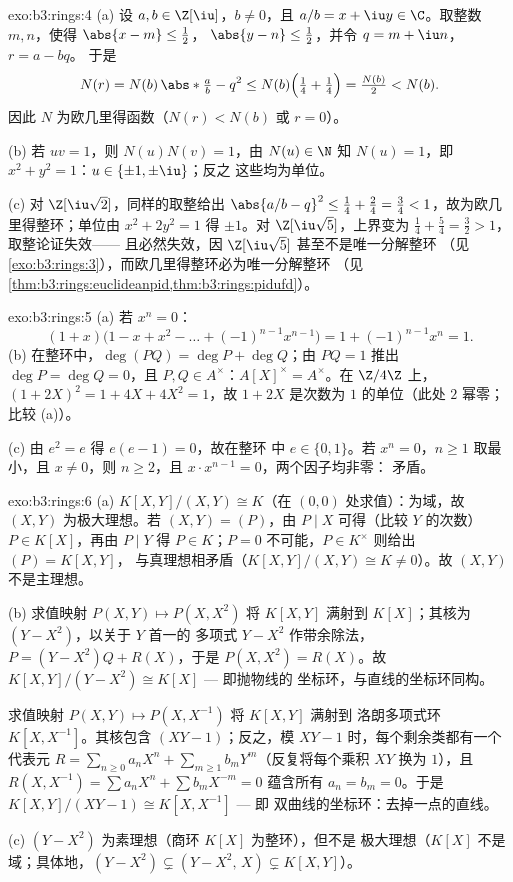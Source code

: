 \begin{solution}{exo:b3:rings:4}
(a) 设 $a, b \in \Z[\iu]$，$b \neq 0$，且 $a/b = x + \iu y \in
\C$。取整数 $m, n$，使得 $\abs{x - m} \leq \frac12$，
$\abs{y - n} \leq \frac12$，并令 $q = m + \iu n$，$r = a - bq$。
于是
\[
N(r) = N(b)\,\abs*{\tfrac ab - q}^2
\leq N(b)\Bigl(\tfrac14 + \tfrac14\Bigr) = \tfrac{N(b)}2 < N(b).
\]
因此 $N$ 为欧几里得函数（$N(r) < N(b)$ 或 $r = 0$）。

(b) 若 $uv = 1$，则 $N(u)N(v) = 1$，由 $N(u) \in \N$ 知 $N(u) =
1$，即 $x^2 + y^2 = 1$：$u \in \{\pm 1, \pm\iu\}$；反之
这些均为单位。

(c) 对 $\Z[\iu\sqrt2]$，同样的取整给出 $\abs{a/b - q}^2
\leq \frac14 + \frac{2}4 = \frac34 < 1$，故为欧几里得整环；单位由 $x^2 +
2y^2 = 1$ 得 $\pm 1$。对 $\Z[\iu\sqrt5]$，上界变为
$\frac14 + \frac54 = \frac32 > 1$，取整论证失效——
且必然失效，因 $\Z[\iu\sqrt5]$ 甚至不是唯一分解整环
（见\cref{exo:b3:rings:3}），而欧几里得整环必为唯一分解整环
（见\cref{thm:b3:rings:euclideanpid,thm:b3:rings:pidufd}）。
\end{solution}

\begin{solution}{exo:b3:rings:5}
(a) 若 $x^n = 0$：
\[
(1 + x)\bigl(1 - x + x^2 - \dots + (-1)^{n-1}x^{n-1}\bigr)
= 1 + (-1)^{n-1}x^n = 1 .
\]
(b) 在整环中，$\deg(PQ) = \deg P + \deg Q$；由 $PQ = 1$ 推出
$\deg P = \deg Q = 0$，且 $P, Q \in A^\times$：$A[X]^\times =
A^\times$。在 $\Z/4\Z$ 上，$(1 + 2X)^2 = 1 + 4X + 4X^2 = 1$，故 $1
+ 2X$ 是次数为 $1$ 的单位（此处 $2$ 幂零；比较
(a)）。

(c) 由 $e^2 = e$ 得 $e(e - 1) = 0$，故在整环
中 $e \in \{0, 1\}$。若 $x^n = 0$，$n \geq 1$ 取最小，且 $x \ne 0$，则
$n \geq 2$，且 $x \cdot x^{n-1} = 0$，两个因子均非零：
矛盾。
\end{solution}

\begin{solution}{exo:b3:rings:6}
(a) $K[X,Y]/(X,Y) \cong K$（在 $(0,0)$ 处求值）：为域，故
$(X,Y)$ 为极大理想。若 $(X, Y) = (P)$，由 $P \mid X$ 可得（比较
$Y$ 的次数）$P \in K[X]$，再由 $P \mid Y$ 得 $P \in K$；$P =
0$ 不可能，$P \in K^\times$ 则给出 $(P) = K[X,Y]$，
与真理想相矛盾（$K[X,Y]/(X,Y) \cong K \neq 0$）。故
$(X,Y)$ 不是主理想。

(b) 求值映射 $P(X, Y) \mapsto P(X, X^2)$ 将 $K[X,Y]$ 满射到
$K[X]$；其核为 $(Y - X^2)$，以关于 $Y$ 首一的
多项式 $Y - X^2$ 作带余除法，$P = (Y - X^2)Q + R(X)$，于是 $P(X, X^2) =
R(X)$。故 $K[X,Y]/(Y - X^2) \cong K[X]$ --- 即抛物线的
坐标环，与直线的坐标环同构。

求值映射 $P(X, Y) \mapsto P(X, X^{-1})$ 将 $K[X, Y]$ 满射到
洛朗多项式环 $K[X, X^{-1}]$。其核包含
$(XY - 1)$；反之，模 $XY - 1$ 时，每个剩余类都有一个
代表元 $R = \sum_{n \geq 0} a_nX^n + \sum_{m \geq 1} b_m
Y^m$（反复将每个乘积 $XY$ 换为 $1$），且 $R(X,
X^{-1}) = \sum a_n X^n + \sum b_m X^{-m} = 0$ 蕴含所有 $a_n =
b_m = 0$。于是 $K[X, Y]/(XY - 1) \cong K[X, X^{-1}]$ --- 即
双曲线的坐标环：去掉一点的直线。

(c) $(Y - X^2)$ 为素理想（商环 $K[X]$ 为整环），但不是
极大理想（$K[X]$ 不是域；具体地，$(Y - X^2) \subsetneq
(Y - X^2,\, X) \subsetneq K[X,Y]$）。
\end{solution}

